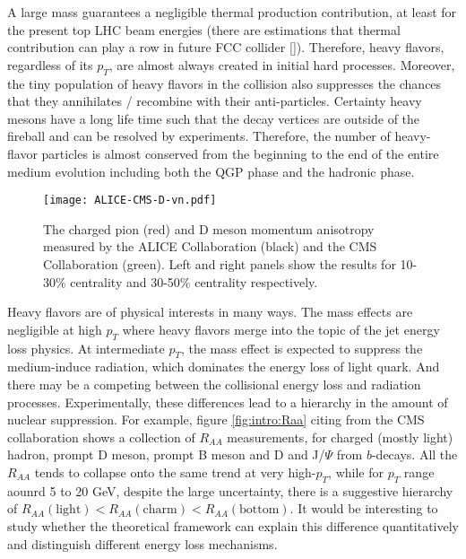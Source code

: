 A large mass guarantees a negligible thermal production contribution, at least for the present top LHC beam energies (there are estimations that thermal contribution can play a row in future FCC collider []).
Therefore, heavy flavors, regardless of its $p_T$, are almost always created in initial hard processes.
Moreover, the tiny population of heavy flavors in the collision also suppresses the chances that they annihilates / recombine with their anti-particles.
Certainty heavy mesons have a long life time such that the decay vertices are outside of the fireball and can be resolved by experiments.
Therefore, the number of heavy-flavor particles is almost conserved from the beginning to the end of the entire medium evolution including both the QGP phase and the hadronic phase.

\begin{figure}
\centering
\texttt{[image: ALICE-CMS-D-vn.pdf]}
\caption{The charged pion (red) and D meson momentum anisotropy measured by the ALICE Collaboration (black) and the CMS Collaboration (green). Left and right panels show the results for 10-30\% centrality and 30-50\% centrality respectively.}
\label{fig:intro:D-vn}
\end{figure}

Heavy flavors are of physical interests in many ways.
The mass effects are negligible at high $p_T$ where heavy flavors merge into the topic of the jet energy loss physics.
At intermediate $p_T$, the mass effect is expected to suppress the medium-induce radiation, which dominates the energy loss of light quark.
And there may be a competing between the collisional energy loss and radiation processes.
Experimentally, these differences lead to a hierarchy in the amount of nuclear suppression.
For example, figure \ref{fig:intro:Raa} citing from the CMS collaboration shows a collection of $R_{AA}$ measurements, for charged (mostly light) hadron, prompt D meson, prompt B meson and D and J/$\Psi$ from $b$-decays.
All the $R_{AA}$ tends to collapse onto the same trend at very high-$p_T$, while for $p_T$ range aounrd 5 to 20 GeV, despite the large uncertainty, there is a suggestive hierarchy of $R_{AA}(\textrm{light}) < R_{AA}(\textrm{charm}) < R_{AA}(\textrm{bottom})$.
It would be interesting to study whether the theoretical framework can explain this difference quantitatively and distinguish different energy loss mechanisms.

